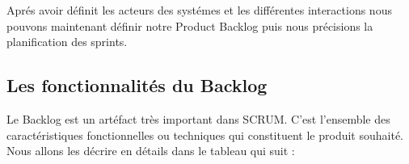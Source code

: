 
Apr\'{e}s avoir d\'{e}finit les acteurs des systémes et les diff\'{e}rentes interactions nous pouvons maintenant définir notre Product Backlog
puis nous pr\'{e}cisions la planification des sprints.

\subsection{Les fonctionnalit\'{e}s du Backlog}
Le Backlog est un art\'{e}fact tr\`{e}s important dans SCRUM. C'est l'ensemble des caract\'{e}ristiques
fonctionnelles ou techniques qui constituent le produit souhait\'{e}.
Nous allons les d\'{e}crire en d\'{e}tails dans le tableau qui suit :



\begin{table}


\end{table}
